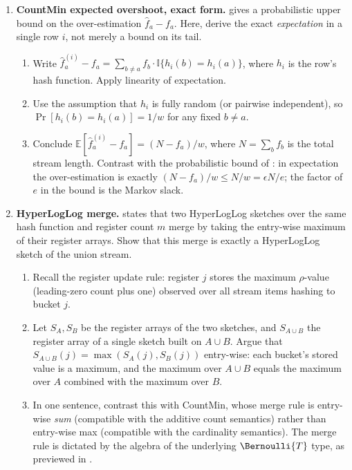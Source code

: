 \begin{enumerate}
\item \exstarstarstar
\label{ex:ch10-9}
\textbf{CountMin expected overshoot, exact form.}
 gives a probabilistic upper bound on the
over-estimation $\hat{f}_a - f_a$. Here, derive the exact
\emph{expectation} in a single row $i$, not merely a bound on its
tail.
\begin{enumerate}
  \item[(a)] Write $\hat{f}_a^{(i)} - f_a = \sum_{b \ne a} f_b
    \cdot \mathbb{I}\{h_i(b) = h_i(a)\}$, where $h_i$ is the row's
    hash function. Apply linearity of expectation.
  \item[(b)] Use the assumption that $h_i$ is fully random (or
    pairwise independent), so $\Pr[h_i(b) = h_i(a)] = 1 / w$ for
    any fixed $b \ne a$.
  \item[(c)] Conclude $\mathbb{E}[\hat{f}_a^{(i)} - f_a] = (N - f_a)
    / w$, where $N = \sum_b f_b$ is the total stream length.
    Contrast with the probabilistic bound of
    : in expectation the over-estimation
    is exactly $(N - f_a) / w \le N / w = \epsilon N / e$; the
    factor of $e$ in the bound is the Markov slack.
\end{enumerate}

\item \exstarstarstar
\label{ex:ch10-10}
\textbf{HyperLogLog merge.}
 states that two HyperLogLog sketches over
the same hash function and register count $m$ merge by taking the
entry-wise maximum of their register arrays. Show that this merge
is exactly a HyperLogLog sketch of the union stream.
\begin{enumerate}
  \item[(a)] Recall the register update rule: register $j$ stores
    the maximum $\rho$-value (leading-zero count plus one) observed
    over all stream items hashing to bucket $j$.
  \item[(b)] Let $S_A, S_B$ be the register arrays of the two
    sketches, and $S_{A \cup B}$ the register array of a single
    sketch built on $A \cup B$. Argue that $S_{A \cup B}(j) =
    \max(S_A(j), S_B(j))$ entry-wise: each bucket's stored value
    is a maximum, and the maximum over $A \cup B$ equals the
    maximum over $A$ combined with the maximum over $B$.
  \item[(c)] In one sentence, contrast this with CountMin, whose
    merge rule is entry-wise \emph{sum} (compatible with the
    additive count semantics) rather than entry-wise max
    (compatible with the cardinality semantics). The merge rule
    is dictated by the algebra of the underlying $\Bernoulli{T}$
    type, as previewed in .
\end{enumerate}


\end{enumerate}

